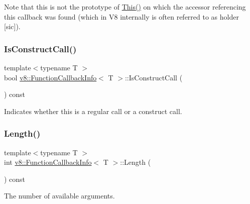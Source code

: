 Note that this is not the prototype of \mbox{\hyperlink{classv8_1_1FunctionCallbackInfo_a4ddfd6d21732dff1c4c55d5441a8a5ca}{This()}} on which the accessor referencing this callback was found (which in V8 internally is often referred to as holder \mbox{[}sic\mbox{]}). \mbox{\label{classv8_1_1FunctionCallbackInfo_ad2105b93e9b4d02f42b7338fa5950cbc}} 
\subsubsection{\texorpdfstring{Is\+Construct\+Call()}{IsConstructCall()}}
{\footnotesize\ttfamily template$<$typename T $>$ \\
bool \mbox{\hyperlink{classv8_1_1FunctionCallbackInfo}{v8\+::\+Function\+Callback\+Info}}$<$ T $>$\+::Is\+Construct\+Call (\begin{DoxyParamCaption}{ }\end{DoxyParamCaption}) const}

Indicates whether this is a regular call or a construct call. \mbox{\label{classv8_1_1FunctionCallbackInfo_af97dd3f1cb01ed039f9479152ad63a84}} 
\subsubsection{\texorpdfstring{Length()}{Length()}}
{\footnotesize\ttfamily template$<$typename T $>$ \\
int \mbox{\hyperlink{classv8_1_1FunctionCallbackInfo}{v8\+::\+Function\+Callback\+Info}}$<$ T $>$\+::Length (\begin{DoxyParamCaption}{ }\end{DoxyParamCaption}) const}

The number of available arguments. \mbox{\label{classv8_1_1FunctionCallbackInfo_aa04f4c5c984db26a90b591f34550e6fa}} 
